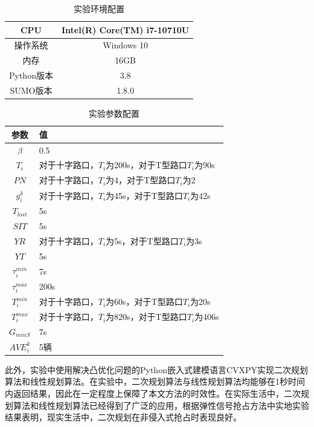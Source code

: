 \begin{table}[H]
	\centering
	\caption{实验环境配置}
	\label{table:shiyanhuanjing}
	\begin{tabular}{|c|c|}
		\hline
		CPU & Intel(R) Core(TM) i7-10710U \\ \hline
		操作系统 & Windows 10 \\ \hline
		内存 & 16GB \\ \hline
		Python版本 & 3.8 \\ \hline
		SUMO版本 & 1.8.0 \\ \hline
	\end{tabular}
\end{table}

\begin{table}[H]
	\centering
	\caption{实验参数配置}
	\label{table:shiyancanshu}
	\begin{tabular}{|c|l|}
		\hline
		参数 & 值 \\ \hline
		${\beta}$ & 0.5 \\ \hline
		${T_i}$ & 对于十字路口，${T_i}$为200s，对于T型路口${T_i}$为90s \\ \hline
		${PN}$ &  对于十字路口，${T_i}$为4，对于T型路口${T_i}$为2 \\ \hline
		${g_i^k}$ & 对于十字路口，${T_i}$为45s，对于T型路口${T_i}$为42s  \\ \hline
		${T_{lost}}$ & 5s \\ \hline
		${SIT}$ & 5s \\ \hline
		${YR}$ & 对于十字路口，${T_i}$为5s，对于T型路口${T_i}$为3s \\ \hline
		${YT}$ & 5s \\ \hline
		${\tau_i^{min}}$ & 7s \\ \hline
		${\tau_i^{max}}$ & 200s \\ \hline
		${T_i^{min}}$ & 对于十字路口，${T_i}$为60s，对于T型路口${T_i}$为20s \\ \hline
		${T_i^{max}}$ & 对于十字路口，${T_i}$为820s，对于T型路口${T_i}$为406s \\ \hline
		${G_{minS}}$ & 7s  \\ \hline
		${AVE_i^k}$ & 5辆 \\ \hline
	\end{tabular}
\end{table}

此外，实验中使用解决凸优化问题的Python嵌入式建模语言CVXPY实现二次规划算法和线性规划算法\cite{diamond2016cvxpy, agrawal2018rewriting}。在实验中，二次规划算法与线性规划算法均能够在1秒时间内返回结果，因此在一定程度上保障了本文方法的时效性。在实际生活中，二次规划算法和线性规划算法已经得到了广泛的应用，根据弹性信号抢占方法\cite{min}中实地实验结果表明，现实生活中，二次规划在非侵入式抢占时表现良好。

